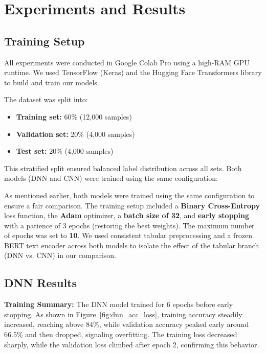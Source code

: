 \section{Experiments and Results}

\subsection{Training Setup}

All experiments were conducted in Google Colab Pro using a high-RAM GPU runtime. We used TensorFlow (Keras) and the Hugging Face Transformers library to build and train our models.

The dataset was split into:
\begin{itemize}
    \item \textbf{Training set:} 60\% (12,000 samples)
    \item \textbf{Validation set:} 20\% (4,000 samples)
    \item \textbf{Test set:} 20\% (4,000 samples)
\end{itemize}

This stratified split ensured balanced label distribution across all sets. Both models (DNN and CNN) were trained using the same configuration:

As mentioned earlier, both models were trained using the same configuration to ensure a fair comparison. The training setup included a \textbf{Binary Cross-Entropy} loss function, the \textbf{Adam} optimizer, a \textbf{batch size of 32}, and \textbf{early stopping} with a patience of 3 epochs (restoring the best weights). The maximum number of epochs was set to \textbf{10}. We used consistent tabular preprocessing and a frozen BERT text encoder across both models to isolate the effect of the tabular branch (DNN vs. CNN) in our comparison.

\subsection{DNN Results}

\textbf{Training Summary:}  
The DNN model trained for 6 epochs before early stopping. As shown in Figure~\ref{fig:dnn_acc_loss}, training accuracy steadily increased, reaching above 84\%, while validation accuracy peaked early around 66.5\% and then dropped, signaling overfitting. The training loss decreased sharply, while the validation loss climbed after epoch 2, confirming this behavior.

